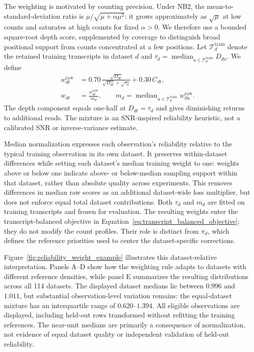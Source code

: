 The weighting is motivated by counting precision.
Under NB2, the mean-to-standard-deviation ratio is
$\mu/\sqrt{\mu+\alpha\mu^2}$: it grows approximately as
$\sqrt{\mu}$ at low counts and saturates at high counts for fixed
$\alpha>0$.
We therefore use a bounded square-root depth score, supplemented
by coverage to distinguish broad positional support from counts
concentrated at a few positions.
Let $\mathcal T_d^{\mathrm{train}}$ denote the retained training
transcripts in dataset $d$ and
$\tau_d=\operatorname{median}_{u\in\mathcal T_d^{\mathrm{train}}}D_{du}$.
We define
\begin{equation}
    \begin{aligned}
        w^{\mathrm{raw}}_{dt}
        &=
        0.70\,
        \frac{\sqrt{D_{dt}}}
             {\sqrt{D_{dt}}+\sqrt{\tau_d}}
        +0.30\,C_{dt},\\
        w_{dt}
        &=
        \frac{w^{\mathrm{raw}}_{dt}}{m_d},
        \qquad
        m_d=
        \operatorname{median}_{u\in\mathcal T_d^{\mathrm{train}}}
        w^{\mathrm{raw}}_{du}.
    \end{aligned}
    \label{eq:real_reliability}
\end{equation}
The depth component equals one-half at $D_{dt}=\tau_d$ and gives
diminishing returns to additional reads.
The mixture is an SNR-inspired reliability heuristic, not a
calibrated SNR or inverse-variance estimate.

Median normalization expresses each observation's reliability
relative to the typical training observation in its own dataset.
It preserves within-dataset differences while setting each dataset's
median training weight to one: weights above or below one indicate
above- or below-median sampling support within that dataset,
rather than absolute quality across experiments.
This removes differences in median raw scores as an additional
dataset-wide loss multiplier, but does not enforce equal total
dataset contributions.
Both $\tau_d$ and $m_d$ are fitted on training transcripts and frozen
for evaluation.
The resulting weights enter the transcript-balanced objective in
Equation~\ref{eq:transcript_balanced_objective}; they do not modify
the count profiles.
Their role is distinct from $\pi_d$, which defines the reference
priorities used to center the dataset-specific corrections.

Figure~\ref{fig:reliability_weight_example} illustrates this
dataset-relative interpretation.
Panels A--D show how the weighting rule adapts to datasets with
different reference densities, while panel E summarizes the
resulting distributions across all 114 datasets.
The displayed dataset medians lie between $0.996$ and $1.011$,
but substantial observation-level variation remains: the
equal-dataset mixture has an interquartile range of
$0.620$--$1.394$.
All eligible observations are displayed, including held-out rows
transformed without refitting the training references.
The near-unit medians are primarily a consequence of normalization,
not evidence of equal dataset quality or independent validation
of held-out reliability.

